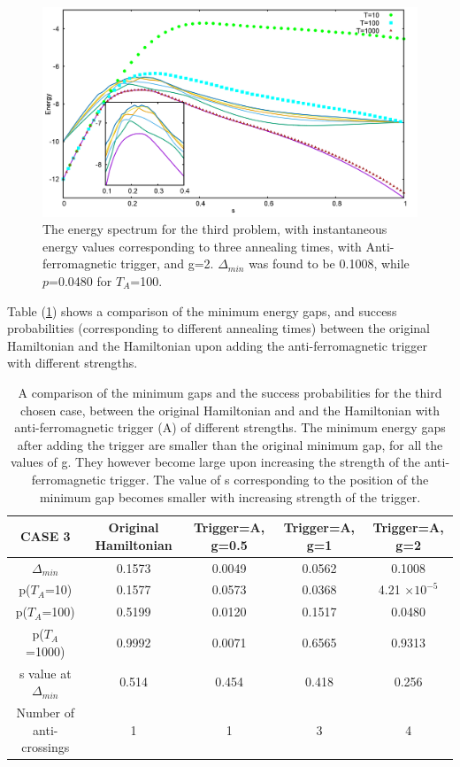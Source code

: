\documentclass[../main.tex]{subfiles}
\begin{document}
\begin{figure}[H]
\centering 
\includegraphics[scale=0.3]{528_s12_A_g2.png}
\caption{The energy spectrum for the third problem, with instantaneous energy values corresponding to three annealing times, with Anti-ferromagnetic trigger, and g=2. $\Delta_{min}$ was found to be 0.1008, while $p$=0.0480 for $T_A$=100. }
\label{fig:a9}
\end{figure}

Table (\ref{tab:a3}) shows a comparison of the minimum energy gaps, and success probabilities (corresponding to different annealing times) between the original Hamiltonian and the Hamiltonian upon adding the anti-ferromagnetic trigger with different strengths. 

\begin{table}[H]
\centering
\renewcommand{\arraystretch}{1.5}
\begin{tabular}{|c|c|c|c|c|}
\hline 
CASE 3 & Original Hamiltonian & Trigger=A, g=0.5 & Trigger=A, g=1 & Trigger=A, g=2 \\ 
\hline 
$\Delta_{min}$ & 0.1573 & 0.0049 & 0.0562 & 0.1008 \\ 
\hline 
p($T_A$=10) & 0.1577 & 0.0573 & 0.0368 & 4.21 $\times 10^{-5}$\\ 
\hline 
p($T_A$=100) & 0.5199 & 0.0120 & 0.1517 & 0.0480 \\ 
\hline 
p($T_A$=1000) & 0.9992 & 0.0071 & 0.6565 & 0.9313 \\ 
\hline 
s value at $\Delta_{min}$ & 0.514 & 0.454 & 0.418 & 0.256 \\ 
\hline 
Number of anti-crossings & 1 & 1 & 3 & 4 \\
\hline
\end{tabular} 
\caption{A comparison of the minimum gaps and the success probabilities for the third chosen case, between the original Hamiltonian and and the Hamiltonian with anti-ferromagnetic trigger (A) of different strengths. The minimum energy gaps after adding the trigger are smaller than the original minimum gap, for all the values of g. They however become large upon increasing the strength of the anti-ferromagnetic trigger. The value of s corresponding to the position of the minimum gap becomes smaller with increasing strength of the trigger.}
\label{tab:a3}
\end{table}
\end{document}
